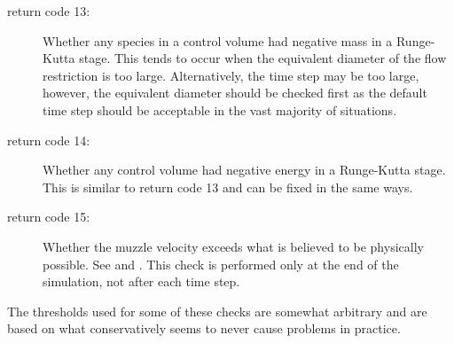 \begin{description}
\item[return code 13:] Whether any species in a control volume had negative mass in a Runge-Kutta stage.
This tends to occur when the equivalent diameter of the flow restriction is too large.
Alternatively, the time step may be too large, however, the equivalent diameter should be checked first as the default time step should be acceptable in the vast majority of situations.
\item[return code 14:] Whether any control volume had negative energy in a Runge-Kutta stage.
This is similar to return code 13 and can be fixed in the same ways.
\item[return code 15:] Whether the muzzle velocity exceeds what is believed to be physically possible.
See \citep[p.~364, eq.~74]{corner_theory_1950} and \citep[p.~19, eq.~11-8]{seigel_theory_1965}.
This check is performed only at the end of the simulation, not after each time step.
\end{description}

The thresholds used for some of these checks are somewhat arbitrary and are based on what conservatively seems to never cause problems in practice.


